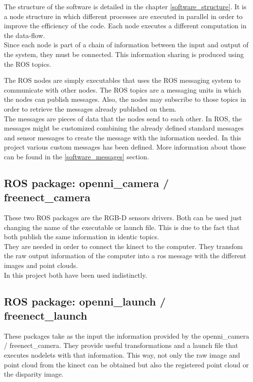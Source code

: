 The structure of the software is detailed in the chapter \ref{software_structure}.  It is a node structure in which different processes are executed in parallel in order to improve the efficiency of the code. Each node executes a different computation in the data-flow. 
\\

Since each node is part of a chain of information between the input and output of the system, they must be connected. This information sharing is produced using the ROS topics. 


The ROS nodes are simply executables that uses the ROS messaging system to communicate with other nodes. The ROS topics are a messaging units in which the nodes can publish messages. Also, the nodes may subscribe to those topics in order to retrieve the messages already published on them. 
\\

The messages are pieces of data that the nodes send to each other. In ROS, the messages might be customized combining the already defined standard messages and sensor messages to create the message with the information needed. In this project various custom messages has been defined. More information about those can be found in the \ref{software_messages} section. 


\subsection{ROS package: openni\_camera / freenect\_camera}

These two ROS packages are the RGB-D sensors drivers. Both can be used just changing the name of the executable or launch file. This is due to the fact that both publish the same information in identic topics. 
\\

They are needed in order to connect the kinect to the computer. They transfom the raw output information of the computer into a ros message with the different images and point clouds. 
\\

In this project both have been used indistinctly.  

\subsection{ROS package: openni\_launch / freenect\_launch}

These packages take as the input the information provided by the openni\_camera / freenect\_camera. They provide useful transformations and a launch file that executes nodelets with that information. This way, not only the raw image and point cloud from the kinect can be obtained but also the registered point cloud or the disparity image. 
\\

